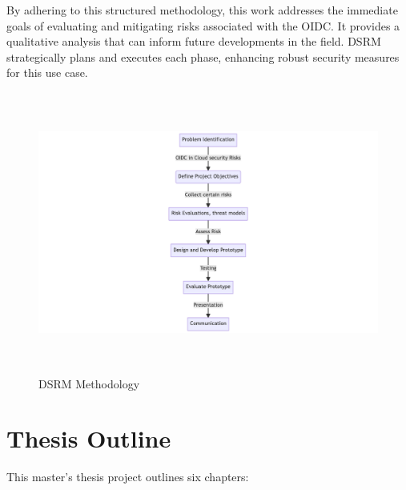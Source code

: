 By adhering to this structured methodology, this work addresses the immediate goals of evaluating and mitigating risks associated with the OIDC.
It provides a qualitative analysis that can inform future developments in the field. DSRM strategically plans and executes each phase,  enhancing robust security measures for this use case.

\begin{figure}[h!]
\centering

\includegraphics[width=\textwidth, height=350px]{pics/dsrm.png}
\caption{DSRM Methodology}
\label{fig:dsrm}
\end{figure}
\newpage
\section{Thesis Outline}

This master's thesis project outlines six chapters:

